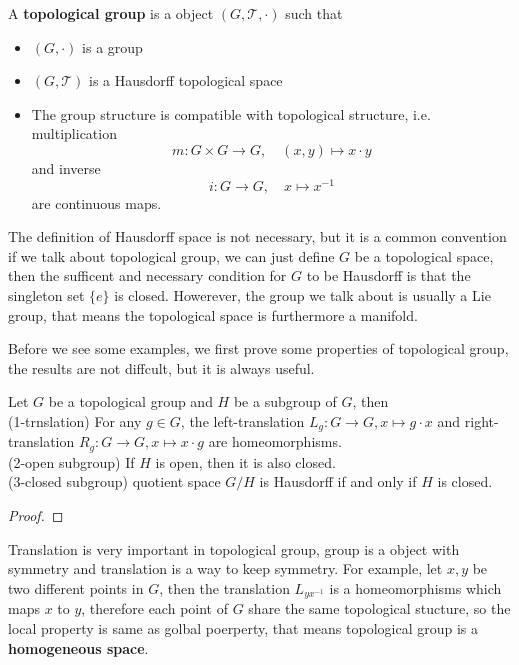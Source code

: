 \documentclass[12pt,a4paper]{article}
\begin{document}
\begin{definition}
A \textbf{topological group} is a object \((G,\mathcal{T},\cdot)\) such that
\begin{itemize}
    \item \((G,\cdot)\) is a group
    \item \((G,\mathcal{T})\) is a Hausdorff topological space
    \item The group structure is compatible with topological structure, i.e. multiplication 
    \[m: G \times G \to G, \quad (x,y) \mapsto x \cdot y\]
    and inverse \[i: G \to G, \quad x \mapsto x^{-1}\]
    are continuous maps.
\end{itemize} 
\end{definition}

\begin{remark}
    The definition of Hausdorff space is not necessary, but it is a common convention if we talk about topological group, we can just define \(G\) be a topological space, then the sufficent and necessary condition for \(G\) to be Hausdorff is that the singleton set \(\{e\}\) is closed. Howerever, the group we talk about is usually a Lie group, that means the topological space is furthermore a manifold.
\end{remark}
 
Before we see some examples, we first prove some properties of topological group, the results are not diffcult, but it is always useful.

\begin{proposition}
    Let \(G\) be a topological group and \(H\) be a subgroup of \(G\), then\\

    (1-trnslation) For any \(g \in G\), the left-translation \(L_g: G \to G, x \mapsto g \cdot x\) and right-translation \(R_g: G \to G, x \mapsto x \cdot g\) are homeomorphisms.\\

    (2-open subgroup) If \(H\) is open, then it is also closed.\\

    (3-closed subgroup) quotient space \(G/H\) is Hausdorff if and only if \(H\) is closed.\\
\end{proposition}

\begin{proof}
    
\end{proof}

\begin{remark}
    Translation is very important in topological group, group is a object with symmetry and translation is a way to keep symmetry. For example, let \(x,y\) be two different points in \(G\), then the translation \(L_{yx^{-1}}\) is a homeomorphisms which maps \(x\) to \(y\), therefore each point of \(G\) share the same topological stucture, so the local property is same as golbal poerperty, that means topological group is a \textbf{homogeneous space}.
\end{remark}
\end{document}
